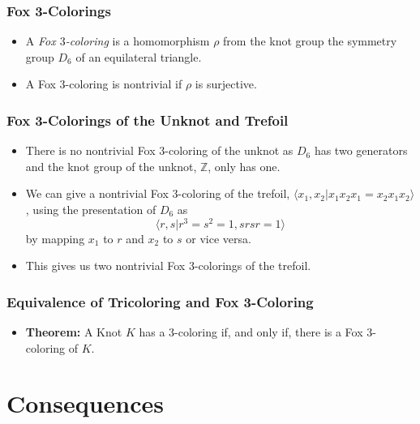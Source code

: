 \documentclass{beamer}
\begin{document}
\begin{frame}
  \frametitle{Fox 3-Colorings}
  \begin{itemize}
  \item A \textit{Fox $3$-coloring} is a homomorphism $\rho$ from
    the knot group the symmetry group $D_6$ of an equilateral
    triangle.
    \pause
  \item A Fox $3$-coloring is nontrivial if $\rho$ is surjective.
  \end{itemize}
\end{frame}

\begin{frame}
  \frametitle{Fox 3-Colorings of the Unknot and Trefoil}
  \begin{itemize}
  \item There is no nontrivial Fox $3$-coloring of the unknot as
    $D_6$ has two generators and the knot group of the unknot, $\mathbb{Z}$,
    only has one.
    \pause
  \item We can give a nontrivial Fox $3$-coloring of the trefoil,
    $\langle x_1,x_2|x_1 x_2 x_1= x_2 x_1 x_2\rangle$, using the presentation of $D_6$ as
    \[
      \langle r,s| r^3=s^2=1, srsr=1\rangle
    \]
    by mapping $x_1$ to $r$ and $x_2$ to $s$ or vice versa.
    \pause
  \item This gives us two nontrivial Fox $3$-colorings of the trefoil.
   \end{itemize}
\end{frame}

\begin{frame}
  \frametitle{Equivalence of Tricoloring and Fox 3-Coloring}
  \begin{itemize}
  \item \textbf{Theorem:} A Knot $K$ has a $3$-coloring if, and only if,
    there is a Fox $3$-coloring of $K$.
  \end{itemize}
\end{frame}

\section{Consequences}
\end{document}
